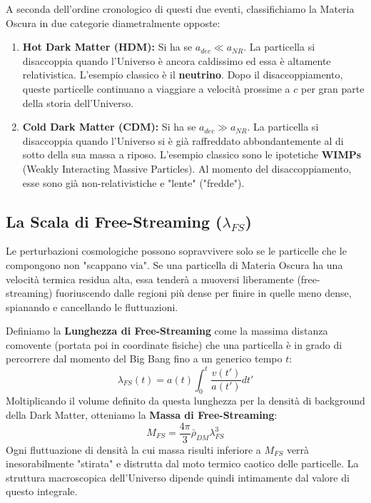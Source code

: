\documentclass[11pt,a4paper]{report}
\begin{document}
A seconda dell'ordine cronologico di questi due eventi, classifichiamo la Materia Oscura in due categorie diametralmente opposte:
\begin{enumerate}
    \item \textbf{Hot Dark Matter (HDM):} Si ha se $a_{dec} \ll a_{NR}$. La particella si disaccoppia quando l'Universo è ancora caldissimo ed essa è altamente relativistica. L'esempio classico è il \textbf{neutrino}. Dopo il disaccoppiamento, queste particelle continuano a viaggiare a velocità prossime a $c$ per gran parte della storia dell'Universo.
    \item \textbf{Cold Dark Matter (CDM):} Si ha se $a_{dec} \gg a_{NR}$. La particella si disaccoppia quando l'Universo si è già raffreddato abbondantemente al di sotto della sua massa a riposo. L'esempio classico sono le ipotetiche \textbf{WIMPs} (Weakly Interacting Massive Particles). Al momento del disaccoppiamento, esse sono già non-relativistiche e "lente" ("fredde").
\end{enumerate}

\subsection{La Scala di Free-Streaming ($\lambda_{FS}$)}
Le perturbazioni cosmologiche possono sopravvivere solo se le particelle che le compongono non "scappano via". Se una particella di Materia Oscura ha una velocità termica residua alta, essa tenderà a muoversi liberamente (free-streaming) fuoriuscendo dalle regioni più dense per finire in quelle meno dense, spianando e cancellando le fluttuazioni.

Definiamo la \textbf{Lunghezza di Free-Streaming} come la massima distanza comovente (portata poi in coordinate fisiche) che una particella è in grado di percorrere dal momento del Big Bang fino a un generico tempo $t$:
\begin{equation}
\lambda_{FS}(t) = a(t) \int_0^t \frac{v(t')}{a(t')} dt'
\end{equation}
Moltiplicando il volume definito da questa lunghezza per la densità di background della Dark Matter, otteniamo la \textbf{Massa di Free-Streaming}:
\begin{equation}
M_{FS} = \frac{4\pi}{3} \bar{\rho}_{DM} \lambda_{FS}^3
\end{equation}
Ogni fluttuazione di densità la cui massa risulti inferiore a $M_{FS}$ verrà inesorabilmente "stirata" e distrutta dal moto termico caotico delle particelle. La struttura macroscopica dell'Universo dipende quindi intimamente dal valore di questo integrale.
\end{document}
